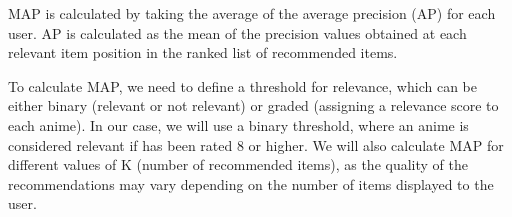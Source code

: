 \documentclass[12pt]{article}
\begin{document}
MAP is calculated by taking the average of the average precision (AP) for each user. AP is calculated as the mean of the precision values obtained at each relevant item position in the ranked list of recommended items.

To calculate MAP, we need to define a threshold for relevance, which can be either binary (relevant or not relevant) or graded (assigning a relevance score to each anime). In our case, we will use a binary threshold, where an anime is considered relevant if has been rated 8 or higher. We will also calculate MAP for different values of K (number of recommended items), as the quality of the recommendations may vary depending on the number of items displayed to the user.




\end{document}
